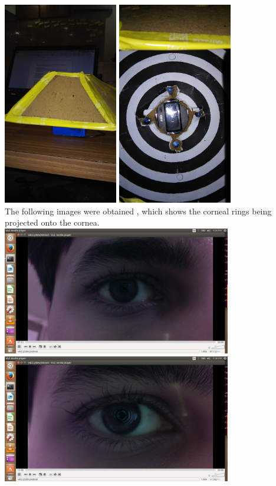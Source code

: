 \documentclass[12pt]{article}
\begin{document}
\includegraphics[width=5cm]{wwr.jpg}
\includegraphics[width=5cm]{re.jpg}\\

The following images were obtained , which shows the corneal rings being projected onto the cornea.\\
\includegraphics[width=10cm]{hj.png}
\includegraphics[width=10cm]{jk.png}
\end{document}
